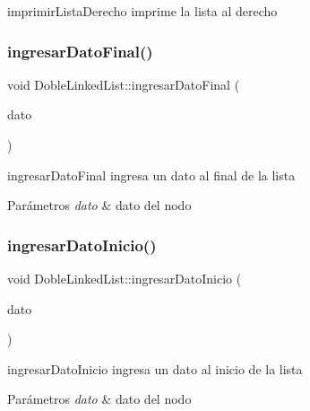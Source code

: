imprimir\+Lista\+Derecho imprime la lista al derecho 

\mbox{\label{class_doble_linked_list_ac44b598ebe998d0790ec6aabbef016cf}} 
\subsubsection{\texorpdfstring{ingresar\+Dato\+Final()}{ingresarDatoFinal()}}
{\footnotesize\ttfamily void Doble\+Linked\+List\+::ingresar\+Dato\+Final (\begin{DoxyParamCaption}\item[{Q\+String}]{dato }\end{DoxyParamCaption})\hspace{0.3cm}{\ttfamily [inline]}}



ingresar\+Dato\+Final ingresa un dato al final de la lista 


\begin{DoxyParams}{Parámetros}
{\em dato} & dato del nodo \\
\hline
\end{DoxyParams}
\mbox{\label{class_doble_linked_list_af49aa0301c35e55c3f49a449375fd031}} 
\subsubsection{\texorpdfstring{ingresar\+Dato\+Inicio()}{ingresarDatoInicio()}}
{\footnotesize\ttfamily void Doble\+Linked\+List\+::ingresar\+Dato\+Inicio (\begin{DoxyParamCaption}\item[{Q\+String}]{dato }\end{DoxyParamCaption})\hspace{0.3cm}{\ttfamily [inline]}}



ingresar\+Dato\+Inicio ingresa un dato al inicio de la lista 


\begin{DoxyParams}{Parámetros}
{\em dato} & dato del nodo \\
\hline
\end{DoxyParams}
\mbox{\label{class_doble_linked_list_a856a0628fb4f272a1609fd8e74b2106a}} 

